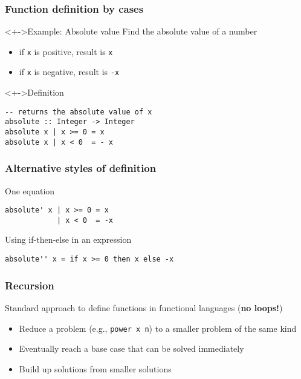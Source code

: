 \documentclass{beamer}
\subtitle{Functions}
\begin{document}
\begin{frame}
  \titlepage
\end{frame}
\begin{frame}[fragile]
  \frametitle{Function definition by cases}
  \begin{block}<+->{Example: Absolute value}
    Find the absolute value of a number
    \begin{itemize}
    \item if \lstinline{x} is positive, result is \lstinline{x}
    \item if \lstinline{x} is negative, result is \lstinline{-x}
    \end{itemize}
  \end{block}
  \begin{block}<+->{Definition}
\begin{lstlisting}
-- returns the absolute value of x
absolute :: Integer -> Integer
absolute x | x >= 0 = x
absolute x | x < 0  = - x
\end{lstlisting}
  \end{block}
\end{frame}

\begin{frame}
  \frametitle{Alternative styles of definition}
  
  \begin{block}{One equation}
\begin{lstlisting}
absolute' x | x >= 0 = x
            | x < 0  = -x
\end{lstlisting}
  \end{block}
  
  \begin{block}{Using if-then-else in an expression}
\begin{lstlisting}
absolute'' x = if x >= 0 then x else -x
\end{lstlisting}
  \end{block}
\end{frame}

\begin{frame}
  \frametitle{Recursion}
  Standard approach to define functions in functional languages
  (\textbf{no loops!})
  \begin{itemize}
  \item
    Reduce a problem (e.g., \lstinline{power x n}) to a smaller
    problem of the same kind 
  \item Eventually reach a base case that can be solved immediately
  \item Build up solutions from smaller solutions
  \end{itemize}
\end{frame}
\end{document}
